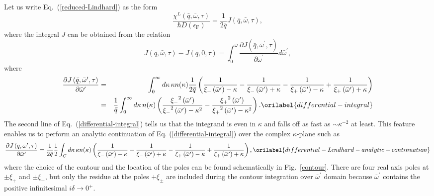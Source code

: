 \documentclass[aps,showkeys,noshowpacs,superscriptaddress,pre,preprint]{revtex4-2}
\let\label\orilabel
\begin{document}
Let us write Eq.~(\ref{reduced-Lindhard}) as the form
\begin{equation*}
\frac{\chi^L \left( \bar{q}, \bar{\omega}, \tau \right)}{\hbar D \left( \epsilon_\mathrm{F} \right) }
= \frac{1}{2 \bar{q}}  {J\left( \bar{q}, \bar{\omega}, \tau \right)} ,
\end{equation*}
where the integral $J$ can be obtained from the relation
\begin{equation*}
{J\left( \bar{q}, \bar{\omega}, \tau \right)} - {J\left( \bar{q}, 0, \tau \right)}
= \int_0^{\bar{\omega}} 
\frac{\partial {J\left( \bar{q}, {\bar{\omega}^\prime}, \tau \right)}}{\partial {\bar{\omega}^\prime}} 
d{\bar{\omega}^\prime} ,
\end{equation*}
where
\begin{eqnarray}
\frac{\partial {J\left( \bar{q}, {\bar{\omega}^\prime}, \tau \right)}}{\partial {\bar{\omega}^\prime}} 
&=& \int_0^\infty d\kappa \, \kappa {n( \kappa )} \frac{1}{2 \bar{q}} \left(
\frac{1}{\xi_{-} \left( {\bar{\omega}^\prime} \right) - \kappa} - \frac{1}{\xi_{-} \left( {\bar{\omega}^\prime} \right) + \kappa}
- \frac{1}{\xi_{+} \left( {\bar{\omega}^\prime} \right) - \kappa} + \frac{1}{\xi_{+} \left( {\bar{\omega}^\prime} \right) + \kappa}
\right) 
\nonumber \\
&=& \frac{1}{\bar{q}} \int_0^\infty d\kappa \, {n ( \kappa )} \left(
\frac{{\xi_{-}}^2 \left( {\bar{\omega}^\prime} \right)}{{\xi_{-}}^2 \left( {\bar{\omega}^\prime} \right) - \kappa^2}
- \frac{{\xi_{+}}^2 \left( {\bar{\omega}^\prime} \right)}{{\xi_{+}}^2 \left( {\bar{\omega}^\prime} \right) - \kappa^2}
\right) .
\label{differential-integral}
\end{eqnarray}
The second line of Eq.~(\ref{differential-integral}) tells us that
the integrand is even in $\kappa$ and falls off as fast as $\sim \kappa^{-2}$ at least.
This feature enables us to perform an analytic continuation of Eq. (\ref{differential-integral}) 
over the complex $\kappa$-plane such as
\begin{equation}
\frac{\partial {J\left( \bar{q}, {\bar{\omega}^\prime}, \tau \right)}}{\partial {\bar{\omega}^\prime}} 
= \frac{1}{2 \bar{q}}  \frac{1}{2} \int_C d\kappa \, \kappa {n( \kappa )} \left(
\frac{1}{\xi_{-} \left( {\bar{\omega}^\prime} \right) - \kappa} - \frac{1}{\xi_{-} \left( {\bar{\omega}^\prime} \right) + \kappa}
- \frac{1}{\xi_{+} \left( {\bar{\omega}^\prime} \right) - \kappa} + \frac{1}{\xi_{+} \left( {\bar{\omega}^\prime} \right) + \kappa}
\right) ,
\label{differential-Lindhard-analytic-continuation}
\end{equation}
where the choice of the contour and the location of the poles can be found schematically in Fig.~\ref{contour}.
There are four real axis poles at  $\pm \xi_{+}$ and $\pm \xi_{-}$,
but only the residue at the poles $+ \xi_{\pm}$ are included during the contour integration
over $\bar{\omega}^\prime$ domain
because ${\bar{\omega}}^\prime$ contains the positive infinitesimal $i \delta \rightarrow 0^+$.
\end{document}
